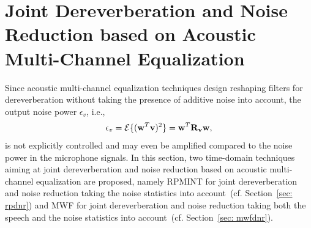 \documentclass[10pt]{IEEEtran}
\begin{document}
\section{Joint Dereverberation and Noise Reduction based on  Acoustic Multi-Channel Equalization}
\label{sec: nr}
Since acoustic multi-channel equalization techniques design reshaping filters for dereverberation without taking the presence of additive noise into account, the output noise power $\epsilon_{v}$, i.e., 
\begin{equation}
\label{eq: np}
\epsilon_v = {\cal{E}} \{(\mathbf{w}^T \mathbf{v})^2 \} = \mathbf{w}^T \mathbf{R}_{\mathbf{v}}\mathbf{w},
\end{equation}
is not explicitly controlled and may even be amplified compared to the noise power in the microphone signals.
In this section, two time-domain techniques aiming at joint dereverberation and noise reduction based on acoustic multi-channel equalization are proposed, namely RPMINT for joint dereverberation and noise reduction taking the noise statistics into account~(cf. Section~\ref{sec: rpdnr}) and MWF for joint dereverberation and noise reduction taking both the speech and the noise statistics into account~(cf. Section~\ref{sec: mwfdnr}).

\end{document}
